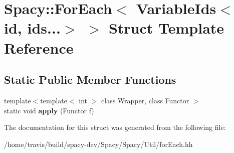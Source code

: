 \hypertarget{structSpacy_1_1ForEach_3_01VariableIds_3_01id_00_01ids_8_8_8_4_01_4}{\section{Spacy\-:\-:For\-Each$<$ Variable\-Ids$<$ id, ids...$>$ $>$ Struct Template Reference}
\label{structSpacy_1_1ForEach_3_01VariableIds_3_01id_00_01ids_8_8_8_4_01_4}
}
\subsection*{Static Public Member Functions}
\begin{DoxyCompactItemize}
\item 
\hypertarget{structSpacy_1_1ForEach_3_01VariableIds_3_01id_00_01ids_8_8_8_4_01_4_a7030374bdacbad991364cdf2a41dec0f}{{\footnotesize template$<$template$<$ int $>$ class Wrapper, class Functor $>$ }\\static void {\bfseries apply} (Functor f)}\label{structSpacy_1_1ForEach_3_01VariableIds_3_01id_00_01ids_8_8_8_4_01_4_a7030374bdacbad991364cdf2a41dec0f}

\end{DoxyCompactItemize}


The documentation for this struct was generated from the following file\-:\begin{DoxyCompactItemize}
\item 
/home/travis/build/spacy-\/dev/\-Spacy/\-Spacy/\-Util/for\-Each.\-hh\end{DoxyCompactItemize}
